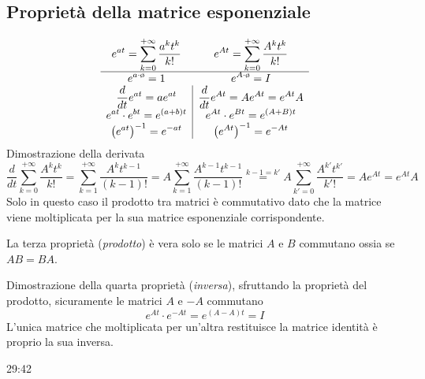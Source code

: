 \subsection{Proprietà della matrice esponenziale}
$$
\begin{array}{>{\displaystyle}c|>{\displaystyle}c}
 e^{at}=\sum_{k=0}^{+\infty} \frac{a^kt^k}{k!} & e^{At}=\sum_{k=0}^{+\infty}
\frac{A^k t^k}{k!} \\ \hline
e^{a\cdot \text{\o{}} } = 1 & e^{A\cdot \text{\o{}}} = I\\
\frac{d}{dt} e^{at} = ae^{at} & \frac{d}{dt} e^{At} = Ae^{At} = e^{At}A\\
e^{at}\cdot e^{bt} = e^{(a+b)t} & e^{At}\cdot e^{Bt} = e^{(A+B)t}\\
\left(e^{at}\right)^{-1} = e^{-at} & \left(e^{At}\right)^{-1} = e^{-At}
\end{array}
$$
Dimostrazione della derivata
$$
\frac{d}{dt} \sum_{k=0}^{+\infty} \frac{A^kt^k}{k!} =
\sum_{k=1}^{+\infty}\frac{A^kt^{k-1}}{(k-1)!} =
A\sum_{k=1}^{+\infty} \frac{A^{k-1}t^{k-1}}{(k-1)!} \stackrel{k-1=k'}{=}
A\sum_{k'=0}^{+\infty}\frac{A^{k'}t^{k'}}{k'!} = Ae^{At} = e^{At}A
$$
Solo in questo caso il prodotto tra matrici è commutativo dato che la matrice
viene moltiplicata per la sua matrice esponenziale corrispondente.

La terza proprietà (\textit{prodotto}) è vera solo se le matrici $A$ e $B$
commutano ossia \linebreak se $AB = BA$.

Dimostrazione della quarta proprietà (\textit{inversa}), sfruttando la
proprietà del prodotto, sicuramente le matrici $A$ e $-A$ commutano
$$
e^{At} \cdot e^{-At} = e^{(A-A)t} = I
$$
L'unica matrice che moltiplicata per un'altra restituisce la matrice identità è
proprio la sua inversa.

29:42
